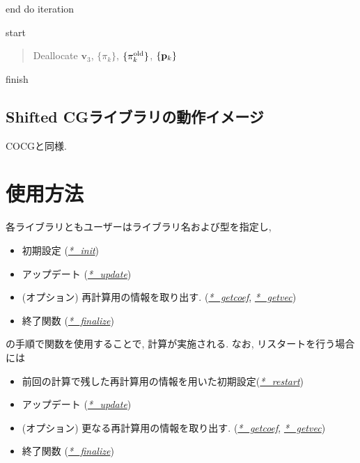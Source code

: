 \documentclass[letterpaper,10pt,dvipdfmx,openany]{sphinxmanual}
\begin{document}
end do iteration

 start
\begin{quote}

Deallocate \({\boldsymbol v}_3\), \(\{\pi_k\}\),
\(\{\pi_k^{\rm old}\}\), \(\{{\bf p}_k\}\)
\end{quote}

 finish


\section{Shifted CGライブラリの動作イメージ}
\label{komega_workflow_ja:shifted-cg}
COCGと同様.


\chapter{使用方法}
\label{komega_usage_ja::doc}\label{komega_usage_ja:id1}
各ライブラリともユーザーはライブラリ名および型を指定し,
\begin{itemize}
\item {} 
初期設定 ({\hyperref[komega_usage_ja:init]{\emph{*\_init}}})

\item {} 
アップデート ({\hyperref[komega_usage_ja:update]{\emph{*\_update}}})

\item {} 
(オプション) 再計算用の情報を取り出す. ({\hyperref[komega_usage_ja:getcoef]{\emph{*\_getcoef}}}, {\hyperref[komega_usage_ja:getvec]{\emph{*\_getvec}}})

\item {} 
終了関数 ({\hyperref[komega_usage_ja:finalize]{\emph{*\_finalize}}})

\end{itemize}

の手順で関数を使用することで, 計算が実施される. なお,
リスタートを行う場合には
\begin{itemize}
\item {} 
前回の計算で残した再計算用の情報を用いた初期設定({\hyperref[komega_usage_ja:restart]{\emph{*\_restart}}})

\item {} 
アップデート ({\hyperref[komega_usage_ja:update]{\emph{*\_update}}})

\item {} 
(オプション) 更なる再計算用の情報を取り出す. ({\hyperref[komega_usage_ja:getcoef]{\emph{*\_getcoef}}}, {\hyperref[komega_usage_ja:getvec]{\emph{*\_getvec}}})

\item {} 
終了関数 ({\hyperref[komega_usage_ja:finalize]{\emph{*\_finalize}}})

\end{itemize}
\end{document}

